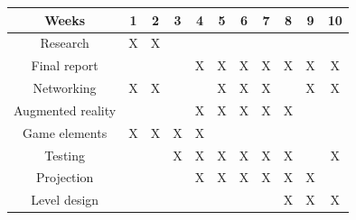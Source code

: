 			\begin{table}[!ht]                                                                                      
				\begin{tabular}{| c | c | c | c | c | c | c | c | c | c | c |}
				\hline
				Weeks             & 1      & 2      & 3      & 4      & 5      & 6      & 7      & 8      & 9      & 10     \\ \hline
				Research          & X      & X      & \space & \space & \space & \space & \space & \space & \space & \space \\ \hline
				Final report      & \space & \space & \space & X      & X      & X      & X      & X      & X      & X \\ \hline
				Networking        & X      & X      & \space & \space & X      & X      & X      & \space & X      & X \\ \hline
				Augmented reality & \space & \space & \space & X      & X      & X      & X      & X      & \space & \space \\ \hline
				Game elements     & X      & X      & X      & X      & \space & \space & \space & \space & \space & \space \\ \hline
				Testing           & \space & \space & X      & X      & X      & X      & X      & X      & \space & X \\ \hline
				Projection        & \space & \space & \space & X      & X      & X      & X      & X      & X      & \space \\ \hline
				Level design      & \space & \space & \space & \space & \space & \space & \space & X      & X      & X \\ \hline
				\end{tabular}
			\end{table}
